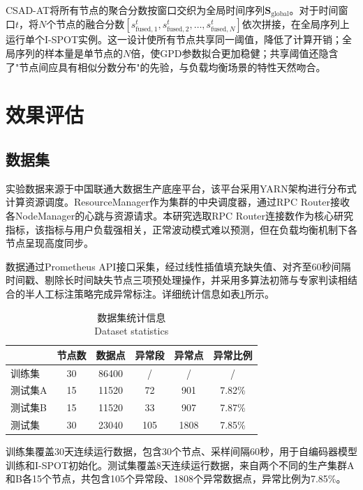 \documentclass[10.5pt,a4paper,twocolumn]{ctexart}
\newcommand{\bicaption}[2]{%
  \caption{#1\\{\small #2}}%
}
\begin{document}
CSAD-AT将所有节点的聚合分数按窗口交织为全局时间序列$\mathbf{S}_{\text{global}}$。对于时间窗口$t$，将$N$个节点的融合分数$[s_{\text{fused},1}^t, s_{\text{fused},2}^t, \ldots, s_{\text{fused},N}^t]$依次拼接，在全局序列上运行单个I-SPOT实例。这一设计使所有节点共享同一阈值，降低了计算开销；全局序列的样本量是单节点的$N$倍，使GPD参数拟合更加稳健；共享阈值还隐含了"节点间应具有相似分数分布"的先验，与负载均衡场景的特性天然吻合。


\section{效果评估}

\subsection{数据集}

实验数据来源于中国联通大数据生产底座平台，该平台采用YARN架构进行分布式计算资源调度。ResourceManager作为集群的中央调度器，通过RPC Router接收各NodeManager的心跳与资源请求。本研究选取RPC Router连接数作为核心研究指标，该指标与用户负载强相关，正常波动模式难以预测，但在负载均衡机制下各节点呈现高度同步。

数据通过Prometheus API接口采集，经过线性插值填充缺失值、对齐至60秒间隔时间戳、剔除长时间缺失节点三项预处理操作，并采用多算法初筛与专家判读相结合的半人工标注策略完成异常标注。详细统计信息如表\ref{tab:dataset_stats}所示。

\begin{table}[htbp]
    \centering
    \bicaption{数据集统计信息}{Dataset statistics}
    \label{tab:dataset_stats}
    \begin{tabular}{lccccc}
        \toprule
         & 节点数 & 数据点 & 异常段 & 异常点 & 异常比例 \\
        \midrule
        训练集   & 30 & 86400 & /  & /    & /      \\
        测试集A  & 15 & 11520 & 72 & 901  & 7.82\% \\
        测试集B  & 15 & 11520 & 33 & 907  & 7.87\% \\
        测试集   & 30 & 23040 & 105& 1808 & 7.85\% \\
        \bottomrule
    \end{tabular}
\end{table}

训练集覆盖30天连续运行数据，包含30个节点、采样间隔60秒，用于自编码器模型训练和I-SPOT初始化。测试集覆盖8天连续运行数据，来自两个不同的生产集群A和B各15个节点，共包含105个异常段、1808个异常数据点，异常比例为7.85\%。
\end{document}
